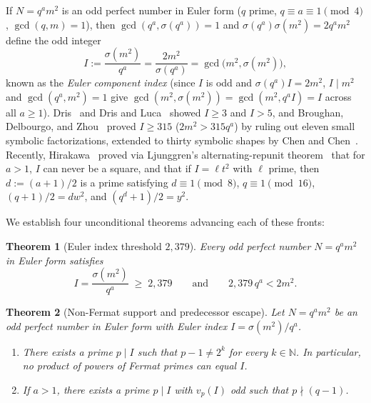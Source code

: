 \documentclass[11pt]{amsart}
\newtheorem{theorem}{Theorem}
\theoremstyle{definition}
\theoremstyle{remark}
\begin{document}
If $N = q^a m^2$ is an odd perfect number in Euler form ($q$ prime, $q \equiv a \equiv 1 \pmod 4$, $\gcd(q, m) = 1$), then $\gcd(q^a, \sigma(q^a)) = 1$ and $\sigma(q^a)\sigma(m^2) = 2 q^a m^2$ define the odd integer
\[
  I := \frac{\sigma(m^2)}{q^a} = \frac{2 m^2}{\sigma(q^a)} = \gcd\bigl(m^2, \sigma(m^2)\bigr),
\]
known as the \emph{Euler component index} (since $I$ is odd and $\sigma(q^a)I = 2m^2$, $I \mid m^2$ and $\gcd(q^a, m^2) = 1$ give $\gcd(m^2, \sigma(m^2)) = \gcd(m^2, q^a I) = I$ across all $a \ge 1$). Dris~\cite{Dris2012} and Dris and Luca~\cite{DrisLuca2016} showed $I \ge 3$ and $I > 5$, and Broughan, Delbourgo, and Zhou~\cite[Thm.~10, Cor.~11]{BDZ2013} proved $I \ge 315$ ($2 m^2 > 315 q^a$) by ruling out eleven small symbolic factorizations, extended to thirty symbolic shapes by Chen and Chen~\cite{ChenChen2014}. Recently, Hirakawa~\cite{Hirakawa2024} proved via Ljunggren's alternating-repunit theorem~\cite{Ljunggren1943} that for $a > 1$, $I$ can never be a square, and that if $I = \ell t^2$ with $\ell$ prime, then $d := (a + 1)/2$ is a prime satisfying $d \equiv 1 \pmod 8$, $q \equiv 1 \pmod{16}$, $(q + 1)/2 = d w^2$, and $(q^d + 1)/2 = y^2$.

We establish four unconditional theorems advancing each of these fronts:

\begin{theorem}[Euler index threshold $2{,}379$]\label{thm:2379}
Every odd perfect number $N = q^a m^2$ in Euler form satisfies
\[
  I = \frac{\sigma(m^2)}{q^a} \;\ge\; 2{,}379 \qquad \text{and} \qquad 2{,}379\, q^a < 2 m^2.
\]
\end{theorem}

\begin{theorem}[Non-Fermat support and predecessor escape]\label{thm:nonfermat}
Let $N = q^a m^2$ be an odd perfect number in Euler form with Euler index $I = \sigma(m^2)/q^a$.
\begin{enumerate}
  \item There exists a prime $p \mid I$ such that $p - 1 \ne 2^k$ for every $k \in \mathbb{N}$. In particular, no product of powers of Fermat primes can equal $I$.
  \item If $a > 1$, there exists a prime $p \mid I$ with $v_p(I)$ odd such that $p \nmid (q - 1)$.
\end{enumerate}
\end{theorem}
\end{document}
